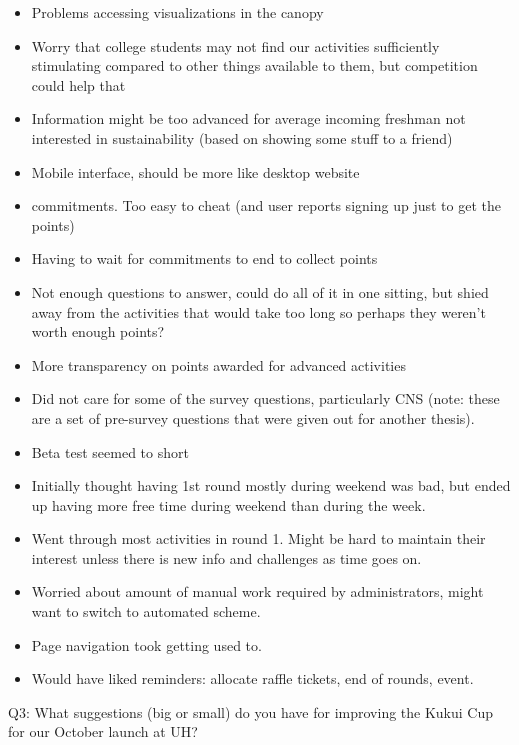 \begin{itemize}
  \item Problems accessing visualizations in the canopy
  \item Worry that college students may not find our activities sufficiently stimulating compared to other things available to them, but competition could help that
  \item Information might be too advanced for average incoming freshman not interested in sustainability (based on showing some stuff to a friend)
  \item Mobile interface, should be more like desktop website
  \item commitments. Too easy to cheat (and user reports signing up just to get the points)
  \item Having to wait for commitments to end to collect points
  \item Not enough questions to answer, could do all of it in one sitting, but shied away from the activities that would take too long so perhaps they weren't worth enough points?
  \item More transparency on points awarded for advanced activities
  \item Did not care for some of the survey questions, particularly CNS (note: these are a set of pre-survey questions that were given out for another thesis).
  \item Beta test seemed to short
  \item Initially thought having 1st round mostly during weekend was bad, but ended up having more free time during weekend than during the week.
  \item Went through most activities in round 1. Might be hard to maintain their interest unless there is new info and challenges as time goes on.
  \item Worried about amount of manual work required by administrators, might want to switch to automated scheme.
  \item Page navigation took getting used to.
  \item Would have liked reminders: allocate raffle tickets, end of rounds, event.
\end{itemize}

Q3: What suggestions (big or small) do you have for improving the Kukui Cup for our October launch at UH?

